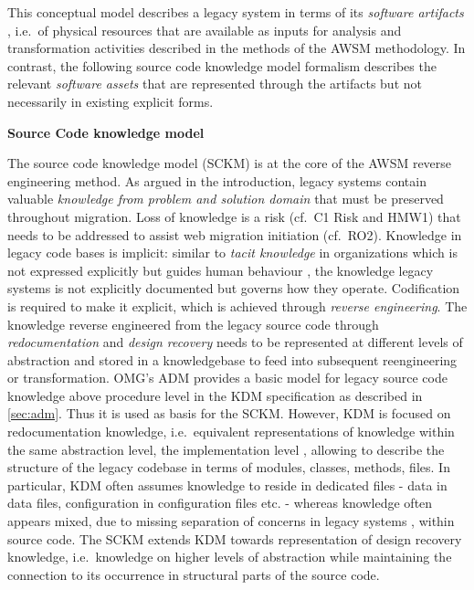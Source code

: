 This conceptual model describes a legacy system in terms of its \emph{software artifacts} \autocite{OMG2016KDM}, i.e.~of physical resources that are available as inputs for analysis and transformation activities described in the methods of the AWSM methodology.
In contrast, the following source code knowledge model formalism describes the relevant \emph{software assets} \autocite{OMG2016KDM} that are represented through the artifacts but not necessarily in existing explicit forms.

\textbf{Source Code knowledge model}

The source code knowledge model (SCKM) is at the core of the AWSM reverse engineering method.
As argued in the introduction, legacy systems contain valuable \emph{knowledge from problem and solution domain} \autocite{Marcus2004ProblemLocation} that must be preserved throughout migration.
Loss of knowledge is a risk (cf.~C1 Risk and HMW1) that needs to be addressed to assist web migration initiation (cf.~RO2).
Knowledge in legacy code bases is implicit: similar to \emph{tacit knowledge} in organizations which is
not expressed explicitly but guides human behaviour \autocite{Nonaka2008TacitKnowledge}, the knowledge legacy systems is not explicitly documented but governs how they operate.
Codification
\autocite{Hansen1999KnowledgeManagement} is required to make it explicit, which is achieved through \emph{reverse engineering}.
The knowledge reverse engineered from the legacy source code through \emph{redocumentation} and \emph{design recovery} needs to be represented at different levels of abstraction \autocite{Chikofsky1990ReverseEngineering} and stored in a knowledgebase to feed into subsequent reengineering or transformation.
OMG's ADM provides a basic model for legacy source code knowledge above procedure level in the KDM specification as described in \cref{sec:adm}.
Thus it is used as basis for the SCKM.
However, KDM is focused on redocumentation knowledge, i.e.~equivalent representations of knowledge within the same abstraction level, the implementation level \autocite{Chikofsky1990ReverseEngineering}, allowing to describe the structure of the legacy codebase in terms of modules, classes, methods, files.
In particular, KDM often assumes knowledge to reside in dedicated files - data in data files, configuration in configuration files etc.
- whereas knowledge often appears mixed, due to missing separation of concerns in legacy systems \autocite{Rodriguez-Echeverria2010MIGRARIA}, within source code.
The SCKM extends KDM towards representation of design recovery knowledge, i.e.~knowledge on higher levels of abstraction while maintaining the connection to its occurrence in structural parts of the source code.

